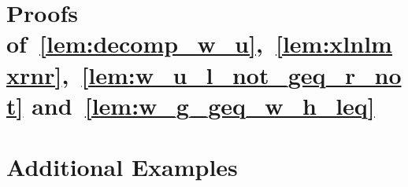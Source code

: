 \documentclass{book}
\begin{document}
\section*{Proofs of~\autoref{lem:decomp_w_u},~\autoref{lem:xlnlmxrnr},~\autoref{lem:w_u_l_not_geq_r_not} and~\autoref{lem:w_g_geq_w_h_leq}}
\label{sec:appendix:a}

\section*{Additional Examples}



\printbibliography
\end{document}
